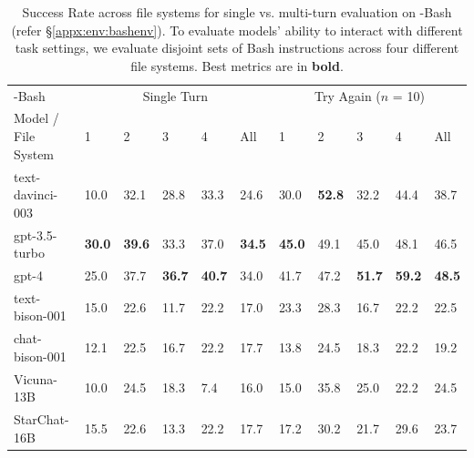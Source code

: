 \begin{table}
\centering
\begin{tabular}{llllll|lllll}
\toprule
     \benchmark{}-Bash & \multicolumn{5}{c}{Single Turn} & \multicolumn{5}{c}{Try Again ($n$ = 10)} \\
Model / File System & 1 & 2 & 3 & 4 & All & 1 & 2 & 3 & 4 & All \\
\midrule
text-davinci-003 & 10.0 & 32.1 & 28.8 & 33.3 & 24.6 & 30.0 & \textbf{52.8} & 32.2 & 44.4 & 38.7 \\
gpt-3.5-turbo & \textbf{30.0} & \textbf{39.6} & 33.3 & 37.0 & \textbf{34.5} & \textbf{45.0} & 49.1 & 45.0 & 48.1 & 46.5 \\
gpt-4 & 25.0 & 37.7 & \textbf{36.7} & \textbf{40.7} & 34.0 & 41.7 & 47.2 & \textbf{51.7} & \textbf{59.2} & \textbf{48.5} \\
text-bison-001 & 15.0 & 22.6 & 11.7 & 22.2 & 17.0 & 23.3 & 28.3 & 16.7 & 22.2 & 22.5 \\
chat-bison-001 & 12.1 & 22.5 & 16.7 & 22.2 & 17.7 & 13.8 & 24.5 & 18.3 & 22.2 & 19.2 \\
Vicuna-13B & 10.0 & 24.5 & 18.3 & 7.4 & 16.0 & 15.0 & 35.8 & 25.0  & 22.2 & 24.5 \\
StarChat-16B & 15.5 & 22.6 & 13.3 & 22.2 & 17.7 & 17.2 & 30.2 & 21.7 & 29.6 & 23.7 \\
\bottomrule
\end{tabular}
\vspace{5pt}
\caption{Success Rate across file systems for single vs. multi-turn evaluation on  \benchmark{}-Bash (refer \S\ref{appx:env:bashenv}). To evaluate models' ability to interact with different task settings, we evaluate disjoint sets of Bash instructions across four different file systems. Best metrics are in \textbf{bold}.}
\label{table:single-vs-multi-bash}
\vspace{-1.5em}
\end{table}